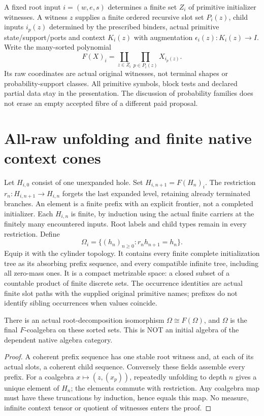 \documentclass[11pt]{article}
\begin{document}
A fixed root input $i=(w,e,s)$ determines a finite set $Z_i$ of primitive initializer witnesses. A witness $z$ supplies a finite ordered recursive slot set $P_i(z)$, child inputs $i_p(z)$ determined by the prescribed binders, actual primitive state/support/ports and context $K_i(z)$ with augmentation $\epsilon_i(z):K_i(z)\to I$. Write the many-sorted polynomial
\[
       F(X)_i=\coprod_{z\in Z_i}\prod_{p\in P_i(z)}X_{i_p(z)}.
\]
Its raw coordinates are actual original witnesses, not terminal shapes or probability-support classes. All primitive symbols, block tests and declared partial data stay in the presentation. The discussion of probability families does not erase an empty accepted fibre of a different paid proposal.

\section{All-raw unfolding and finite native context cones}
Let $H_{i,0}$ consist of one unexpanded hole. Set $H_{i,n+1}=F(H_n)_i$. The restriction $r_n:H_{i,n+1}\to H_{i,n}$ forgets the last expanded level, retaining already terminated branches. An element is a finite prefix with an explicit frontier, not a completed initializer. Each $H_{i,n}$ is finite, by induction using the actual finite carriers at the finitely many encountered inputs. Root labels and child types remain in every restriction. Define
\[
      \Omega_i=\{(h_n)_{n\ge0}:r_nh_{n+1}=h_n\}.
\]
Equip it with the cylinder topology. It contains every finite complete initialization tree as its absorbing prefix sequence, and every compatible infinite tree, including all zero-mass ones. It is a compact metrizable space: a closed subset of a countable product of finite discrete sets. The occurrence identities are actual finite slot paths with the supplied original primitive names; prefixes do not identify sibling occurrences when values coincide.

\begin{proposition}
There is an actual root-decomposition isomorphism $\Omega\cong F(\Omega)$, and $\Omega$ is the final $F$-coalgebra on these sorted sets. This is NOT an initial algebra of the dependent native algebra category.
\end{proposition}
\begin{proof}
A coherent prefix sequence has one stable root witness and, at each of its actual slots, a coherent child sequence. Conversely these fields assemble every prefix. For a coalgebra $x\mapsto(z,(x_p))$, repeatedly unfolding to depth $n$ gives a unique element of $H_n$; the elements commute with restriction. Any coalgebra map must have these truncations by induction, hence equals this map. No measure, infinite context tensor or quotient of witnesses enters the proof.\end{proof}
\end{document}
